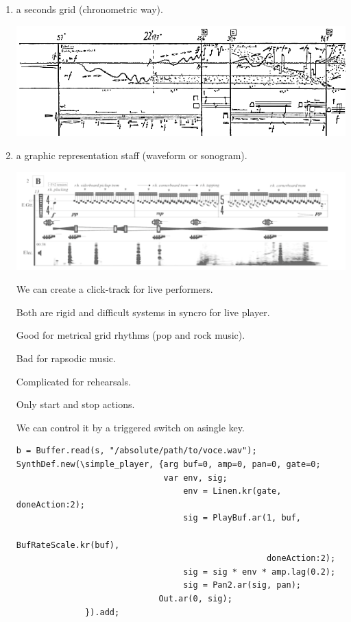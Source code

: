 \begin{enumerate}
\def\labelenumi{\arabic{enumi}.}
\tightlist
\item a seconds grid (chronometric way).
\begin{center}
\includegraphics[scale=0.9]{../img/kont.png}
\end{center}

\item a graphic representation staff (waveform or sonogram).
\begin{center}
\includegraphics[scale=0.9]{../img/kokoras.png}
\end{center}

We can create a click-track for live performers.

Both are rigid and difficult systems in syncro for live player.

Good for metrical grid rhythms (pop and rock music).

Bad for rapsodic music.

Complicated for rehearsals.

Only start and stop actions.

We can control it by a triggered switch on asingle key.

\begin{lstlisting}[frame=single, caption=playback one-shot model] 
b = Buffer.read(s, "/absolute/path/to/voce.wav");
SynthDef.new(\simple_player, {arg buf=0, amp=0, pan=0, gate=0;
                              var env, sig;
                                  env = Linen.kr(gate, doneAction:2);
                                  sig = PlayBuf.ar(1, buf, 
                                                   BufRateScale.kr(buf), 
                                                   doneAction:2);
                                  sig = sig * env * amp.lag(0.2);
                                  sig = Pan2.ar(sig, pan); 
	                         Out.ar(0, sig);
              }).add;


\end{lstlisting}
\end{enumerate}
